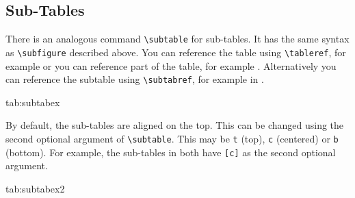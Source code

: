 \documentclass[pmlr]{jmlr}%
\begin{document}
\subsection{Sub-Tables}
\label{sec:subtables}
There is an analogous command \verb|\subtable| for sub-tables.
It has the same syntax as \verb|\subfigure| described above.
You can reference the table using \verb|\tableref|, for example
 or you can reference part of the table,
for example . Alternatively you can reference the
subtable using \verb|\subtabref|, for example
 in .

\begin{table}[htbp]
\floatconts
 {tab:subtabex}
 {\caption{An Example With Sub-Tables}}
 {%
   \qquad
 }
\end{table}

By default, the sub-tables are aligned on the top.
This can be changed using the second optional argument
of \verb|\subtable|. This may be \texttt{t} (top), \texttt{c}
(centered) or \texttt{b} (bottom). For example, the sub-tables
 in 
both have \verb|[c]| as the second optional argument.

\begin{table}[htbp]
\floatconts
 {tab:subtabex2}
 {\caption{Another Example With Sub-Tables}}
 {%
   \qquad
 }
\end{table}
\end{document}
